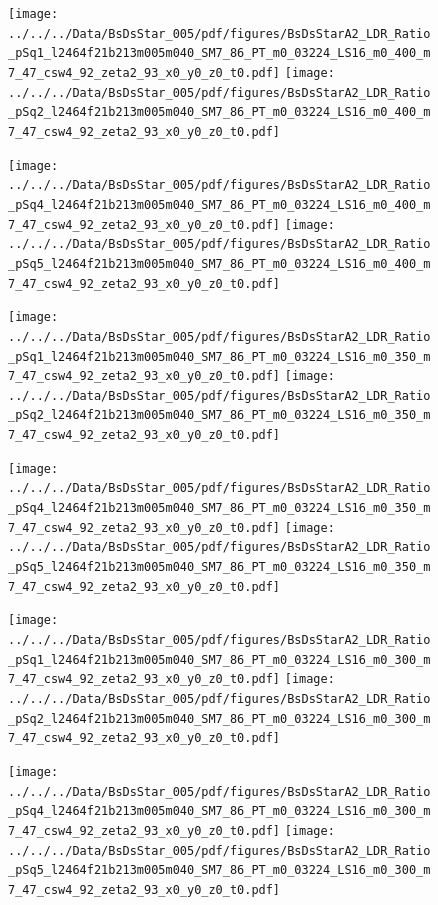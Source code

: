 \documentclass[a4paper,10pt]{article}
\begin{document}
\begin{figure}[p]
 \texttt{[image: ../../../Data/BsDsStar\_005/pdf/figures/BsDsStarA2\_LDR\_Ratio\_pSq1\_l2464f21b213m005m040\_SM7\_86\_PT\_m0\_03224\_LS16\_m0\_400\_m7\_47\_csw4\_92\_zeta2\_93\_x0\_y0\_z0\_t0.pdf]} 
 \texttt{[image: ../../../Data/BsDsStar\_005/pdf/figures/BsDsStarA2\_LDR\_Ratio\_pSq2\_l2464f21b213m005m040\_SM7\_86\_PT\_m0\_03224\_LS16\_m0\_400\_m7\_47\_csw4\_92\_zeta2\_93\_x0\_y0\_z0\_t0.pdf]} 
 \end{figure}
\begin{figure}[p]
 \texttt{[image: ../../../Data/BsDsStar\_005/pdf/figures/BsDsStarA2\_LDR\_Ratio\_pSq4\_l2464f21b213m005m040\_SM7\_86\_PT\_m0\_03224\_LS16\_m0\_400\_m7\_47\_csw4\_92\_zeta2\_93\_x0\_y0\_z0\_t0.pdf]} 
 \texttt{[image: ../../../Data/BsDsStar\_005/pdf/figures/BsDsStarA2\_LDR\_Ratio\_pSq5\_l2464f21b213m005m040\_SM7\_86\_PT\_m0\_03224\_LS16\_m0\_400\_m7\_47\_csw4\_92\_zeta2\_93\_x0\_y0\_z0\_t0.pdf]} 
 \end{figure}
\begin{figure}[p]
 \texttt{[image: ../../../Data/BsDsStar\_005/pdf/figures/BsDsStarA2\_LDR\_Ratio\_pSq1\_l2464f21b213m005m040\_SM7\_86\_PT\_m0\_03224\_LS16\_m0\_350\_m7\_47\_csw4\_92\_zeta2\_93\_x0\_y0\_z0\_t0.pdf]} 
 \texttt{[image: ../../../Data/BsDsStar\_005/pdf/figures/BsDsStarA2\_LDR\_Ratio\_pSq2\_l2464f21b213m005m040\_SM7\_86\_PT\_m0\_03224\_LS16\_m0\_350\_m7\_47\_csw4\_92\_zeta2\_93\_x0\_y0\_z0\_t0.pdf]} 
 \end{figure}
\clearpage
\begin{figure}[p]
 \texttt{[image: ../../../Data/BsDsStar\_005/pdf/figures/BsDsStarA2\_LDR\_Ratio\_pSq4\_l2464f21b213m005m040\_SM7\_86\_PT\_m0\_03224\_LS16\_m0\_350\_m7\_47\_csw4\_92\_zeta2\_93\_x0\_y0\_z0\_t0.pdf]} 
 \texttt{[image: ../../../Data/BsDsStar\_005/pdf/figures/BsDsStarA2\_LDR\_Ratio\_pSq5\_l2464f21b213m005m040\_SM7\_86\_PT\_m0\_03224\_LS16\_m0\_350\_m7\_47\_csw4\_92\_zeta2\_93\_x0\_y0\_z0\_t0.pdf]} 
 \end{figure}
\begin{figure}[p]
 \texttt{[image: ../../../Data/BsDsStar\_005/pdf/figures/BsDsStarA2\_LDR\_Ratio\_pSq1\_l2464f21b213m005m040\_SM7\_86\_PT\_m0\_03224\_LS16\_m0\_300\_m7\_47\_csw4\_92\_zeta2\_93\_x0\_y0\_z0\_t0.pdf]} 
 \texttt{[image: ../../../Data/BsDsStar\_005/pdf/figures/BsDsStarA2\_LDR\_Ratio\_pSq2\_l2464f21b213m005m040\_SM7\_86\_PT\_m0\_03224\_LS16\_m0\_300\_m7\_47\_csw4\_92\_zeta2\_93\_x0\_y0\_z0\_t0.pdf]} 
 \end{figure}
\begin{figure}[p]
 \texttt{[image: ../../../Data/BsDsStar\_005/pdf/figures/BsDsStarA2\_LDR\_Ratio\_pSq4\_l2464f21b213m005m040\_SM7\_86\_PT\_m0\_03224\_LS16\_m0\_300\_m7\_47\_csw4\_92\_zeta2\_93\_x0\_y0\_z0\_t0.pdf]} 
 \texttt{[image: ../../../Data/BsDsStar\_005/pdf/figures/BsDsStarA2\_LDR\_Ratio\_pSq5\_l2464f21b213m005m040\_SM7\_86\_PT\_m0\_03224\_LS16\_m0\_300\_m7\_47\_csw4\_92\_zeta2\_93\_x0\_y0\_z0\_t0.pdf]} 
 \end{figure}
\clearpage
\clearpage
\end{document}
